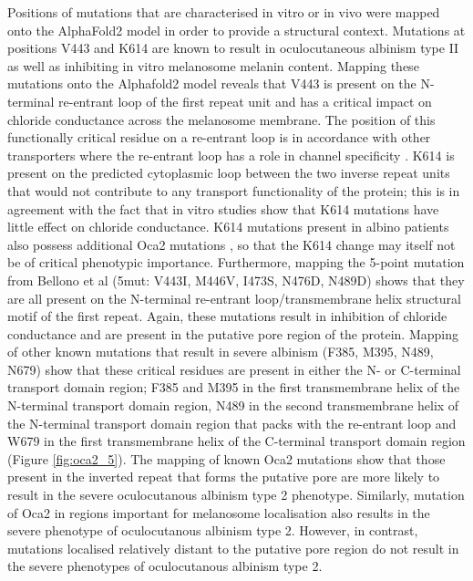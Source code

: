 Positions of mutations that are characterised in vitro or in vivo were mapped onto the AlphaFold2 model in order to provide a structural context. Mutations at positions V443 and K614 are known to result in oculocutaneous albinism type II as well as inhibiting in vitro melanosome melanin content. Mapping these mutations onto the Alphafold2 model reveals that V443 is present on the N-terminal re-entrant loop of the first repeat unit and has a critical impact on chloride conductance across the melanosome membrane. The position of this functionally critical residue on a re-entrant loop is in accordance with other transporters where the re-entrant loop has a role in channel specificity \cite{mesdaghi2020silico}. K614 is present on the predicted cytoplasmic loop between the two inverse repeat units that would not contribute to any transport functionality of the protein; this is in agreement with the fact that in vitro studies show that K614 mutations have little effect on chloride conductance. K614 mutations present in albino patients also possess additional Oca2 mutations \cite{passmore1999novel}, so that the K614 change may itself not be of critical phenotypic importance.
Furthermore, mapping the 5-point mutation from Bellono et al (5mut: V443I, M446V, I473S, N476D, N489D) shows that they are all present on the N-terminal re-entrant loop/transmembrane helix structural motif of the first repeat. Again, these mutations result in inhibition of chloride conductance and are present in the putative pore region of the protein.
Mapping of other known mutations that result in severe albinism (F385, M395, N489, N679) \cite{king2003mc1r,passmore1999novel,simeonov2013dna} show that these critical residues are present in either the N- or C-terminal transport domain region; F385 and M395 in the first transmembrane helix of the N-terminal transport domain region, N489 in the second transmembrane helix of the N-terminal transport domain region that packs with the re-entrant loop and W679 in the first transmembrane helix of the C-terminal transport domain region (Figure \ref{fig:oca2_5}).
The mapping of known Oca2 mutations show that those present in the inverted repeat that forms the putative pore are more likely to result in the severe oculocutanous albinism type 2 phenotype. Similarly, mutation of Oca2 in regions important for melanosome localisation also results in the severe phenotype of oculocutanous albinism type 2. However, in contrast, mutations localised relatively distant to the putative pore region do not result in the severe phenotypes of oculocutanous albinism  type 2.

